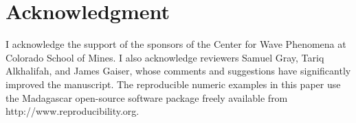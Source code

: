 
\section{Acknowledgment}
I acknowledge the support of the sponsors of the Center for Wave
Phenomena at Colorado School of Mines. I also acknowledge
reviewers Samuel Gray, Tariq Alkhalifah, and James Gaiser, whose
comments and suggestions have significantly improved the manuscript.
The reproducible numeric examples in this paper use the
Madagascar open-source software package freely available from
http://www.reproducibility.org.
